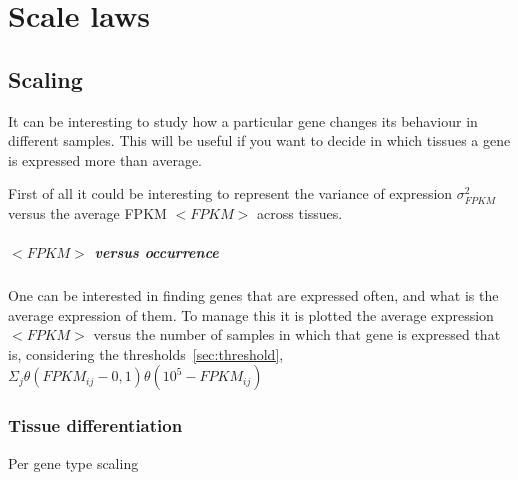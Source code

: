 \chapter{Scale laws}\label{ch:scalelaws}
\section{Scaling}
It can be interesting to study how a particular gene changes its behaviour in different samples. 
This will be useful if you want to decide in which tissues a gene is expressed more than average.

First of all it could be interesting to represent the variance of expression $\sigma^2_{FPKM}$ versus 
the average FPKM $<FPKM>$ across tissues.





\paragraph{$<FPKM>$ versus occurrence}
One can be interested in finding genes that are expressed often, and what is the 
average expression of them.
To manage this it is plotted the average expression $<FPKM>$ versus the number 
of samples in which that gene is expressed that is, considering the thresholds~\ref{sec:threshold}, 
$\Sigma_j\theta (FPKM_{ij}-0,1)\theta (10^5-FPKM_{ij})$

\subsection{Tissue differentiation}
Per gene type scaling




